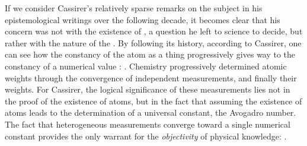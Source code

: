 \documentclass[submitted,12pt]{article}
\begin{document}

If we consider Cassirer’s relatively sparse remarks on the subject in his epistemological writings over the following decade, it becomes clear that his concern was not with the existence of , a question he left to science to decide, but rather with the nature of the  . By following its history, according to Cassirer, one can see how the constancy of the atom as a thing  progressively gives way to the constancy of a numerical value :  . Chemistry progressively determined  atomic weights through the convergence of independent measurements, and finally their  weights. For Cassirer, the logical significance of these measurements lies not in the proof of the existence of atoms, but in the fact that assuming the existence of atoms leads to the determination of a universal constant, the Avogadro number. The fact that heterogeneous measurements converge toward a single numerical constant provides the only warrant for the \emph{objectivity} of physical knowledge:   .
\end{document}
